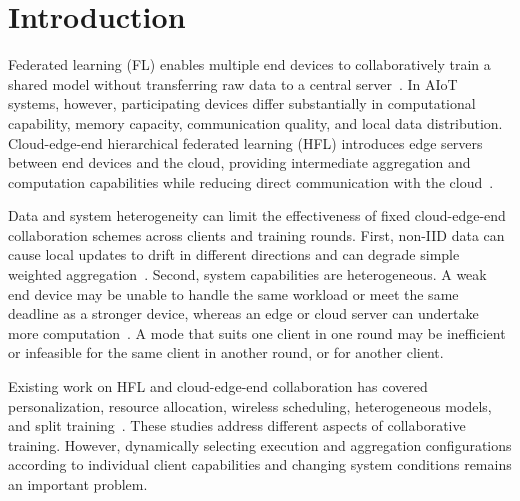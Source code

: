 \documentclass[5p,times]{elsarticle}
\theoremstyle{plain}
\theoremstyle{definition}
\theoremstyle{remark}
\begin{document}
\section{Introduction}
\label{sec:introduction}
Federated learning (FL) enables multiple end devices to collaboratively train a shared model without transferring raw data to a central server~\cite{fedavg,ZHAO2026108518}. In AIoT systems, however, participating devices differ substantially in computational capability, memory capacity, communication quality, and local data distribution. Cloud-edge-end hierarchical federated learning (HFL) introduces edge servers between end devices and the cloud, providing intermediate aggregation and computation capabilities while reducing direct communication with the cloud~\cite{hfl,FLaTEC2026,yang2026hierarchical}.

Data and system heterogeneity can limit the effectiveness of fixed cloud-edge-end collaboration schemes across clients and training rounds. First, non-IID data can cause
local updates to drift in different directions and can degrade simple weighted
aggregation~\cite{fedavgm,fedprox,scaffold,khan2026accelerating,11214447}.
Second, system capabilities are heterogeneous. A weak end device may be unable
to handle the same workload or meet the same deadline as a stronger device,
whereas an edge or cloud server can undertake more computation~\cite{wang2019adaptivefl,FAN2026108249}.
A mode that suits one client in one round may be inefficient or infeasible
for the same client in another round, or for another client.

Existing work on HFL and cloud-edge-end collaboration has covered personalization,
resource allocation, wireless scheduling, heterogeneous models, and split
training~\cite{Personalizedhfl,JSJX202502007,dinh2021wirelessfl,BSBODP,mazloomi2025multiserver,SFETEC,11185336,YAO2026108495}.
These studies address different aspects of collaborative training. However, dynamically selecting execution and aggregation configurations according to individual client capabilities and changing system conditions remains an important problem.
\end{document}

